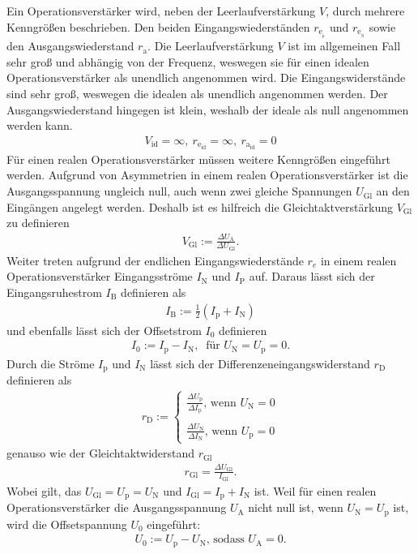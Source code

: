 Ein  Operationsverstärker wird, neben der Leerlaufverstärkung $V$, durch mehrere Kenngrößen beschrieben.
Den beiden Eingangswiederständen $r_{\text{e}_{{}_\text{p}}}$ und $r_{\text{e}_{{}_\text{N}}}$ sowie den Ausgangswiederstand $r_\text{a}$.
Die Leerlaufverstärkung $V$ ist im allgemeinen Fall sehr groß und abhängig von der Frequenz, weswegen sie für einen idealen Operationsverstärker als unendlich angenommen wird.
Die Eingangswiderstände sind sehr groß, weswegen die idealen als unendlich angenommen werden.
Der Ausgangswiederstand hingegen ist klein, weshalb der ideale als null angenommen werden kann.
\begin{align}
	V_\text{id}=\infty,~ r_{\text{e}_\text{id}}=\infty,~ r_{\text{a}_\text{id}}=0
\end{align}
Für einen realen Operationsverstärker müssen weitere Kenngrößen eingeführt werden.
Aufgrund von Asymmetrien in einem realen Operationsverstärker ist die Ausgangsspannung ungleich null, auch wenn zwei gleiche Spannungen $U_\text{Gl}$ an den Eingängen angelegt werden.
Deshalb ist es hilfreich die Gleichtaktverstärkung $V_\text{Gl}$ zu definieren 
\begin{align}
	V_\text{Gl}:=\frac{\Delta U_\text{A}}{\Delta U_\text{Gl}}.
\end{align}
Weiter treten aufgrund der endlichen Eingangswiederstände $r_e$ in einem realen Operationsverstärker Eingangsströme $I_\text{N}$ und $I_\text{P}$ auf.
Daraus lässt sich der Eingangsruhestrom $I_\text{B}$ definieren als
\begin{align}
	I_\text{B}:=\frac{1}{2}\left( I_\text{p} + I_\text{N} \right)
\end{align}
und ebenfalls lässt sich der Offsetstrom $I_0$ definieren
\begin{align}
	I_0:=I_\text{p}-I_\text{N},~ \text{ für }U_\text{N}=U_\text{p}=0.
\end{align}
Durch die Ströme $I_\text{p}$ und $I_\text{N}$ lässt sich der Differenzeneingangswiderstand $r_\text{D}$ definieren als
\begin{align}
	r_\text{D}:=
	\begin{cases}
		\frac{\Delta U_\text{p}}{\Delta I_\text{p}}\text{, wenn } U_\text{N}=0\\
		\\
		\frac{\Delta U_\text{N}}{\Delta I_\text{N}}\text{, wenn } U_\text{p}=0
	\end{cases}
\end{align}
genauso wie der Gleichtaktwiderstand $r_\text{Gl}$
\begin{align}
	r_\text{Gl}=\frac{\Delta U_\text{Gl}}{I_\text{Gl}}.
\end{align}
Wobei gilt, das $U_\text{Gl}=U_\text{p}=U_\text{N}$ und $I_\text{Gl}=I_\text{p}+I_\text{N}$ ist.
Weil für einen realen Operationsverstärker die Ausgangsspannung $U_\text{A}$ nicht null ist, wenn $U_\text{N}=U_\text{p}$ ist, wird die Offsetspannung $U_0$ eingeführt:
\begin{align}
	U_0:=U_\text{p}-U_\text{N}\text{, sodass }U_\text{A}=0.
\end{align}
